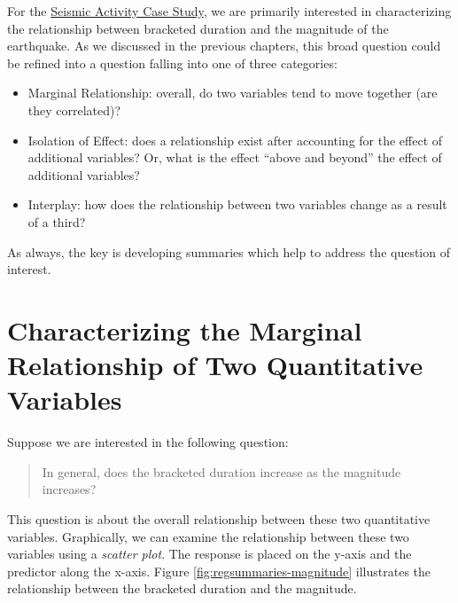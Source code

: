 \documentclass[
]{book}
\providecommand{\tightlist}{%
  \setlength{\itemsep}{0pt}\setlength{\parskip}{0pt}}
\theoremstyle{plain}
\theoremstyle{mydefn}
\theoremstyle{myexmpl}
\theoremstyle{remark}
\begin{document}
For the \protect\hyperlink{CaseGreece}{Seismic Activity Case Study}, we are primarily interested in characterizing the relationship between bracketed duration and the magnitude of the earthquake. As we discussed in the previous chapters, this broad question could be refined into a question falling into one of three categories:

\begin{itemize}
\tightlist
\item
  Marginal Relationship: overall, do two variables tend to move together (are they correlated)?
\item
  Isolation of Effect: does a relationship exist after accounting for the effect of additional variables? Or, what is the effect ``above and beyond'' the effect of additional variables?
\item
  Interplay: how does the relationship between two variables change as a result of a third?
\end{itemize}

As always, the key is developing summaries which help to address the question of interest.

\hypertarget{characterizing-the-marginal-relationship-of-two-quantitative-variables}{%
\section{Characterizing the Marginal Relationship of Two Quantitative Variables}\label{characterizing-the-marginal-relationship-of-two-quantitative-variables}}

Suppose we are interested in the following question:

\begin{quote}
In general, does the bracketed duration increase as the magnitude increases?
\end{quote}

This question is about the overall relationship between these two quantitative variables. Graphically, we can examine the relationship between these two variables using a \emph{scatter plot}. The response is placed on the y-axis and the predictor along the x-axis. Figure \ref{fig:regsummaries-magnitude} illustrates the relationship between the bracketed duration and the magnitude.
\end{document}
